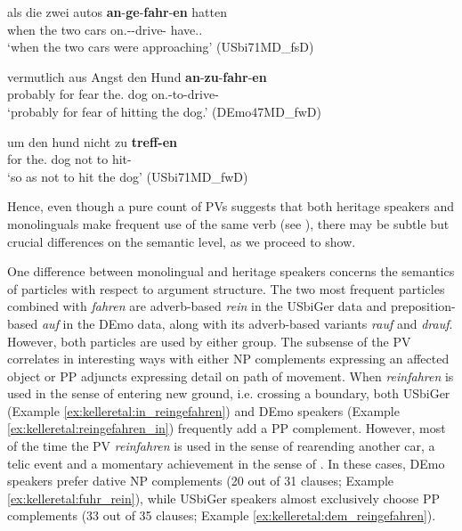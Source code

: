 \documentclass[output=paper,colorlinks,citecolor=brown]{langscibook}
\begin{document}
\ea
\label{ex:kelleretal:angefahren}
\gll als die zwei autos \textbf{an}-\textbf{ge}-\textbf{fahr}-\textbf{en} hatten\\
when the two cars on.\Vpart{}-\Ptcp{}-drive-\Ptcp{} have.\Pst.\Tpl{}\\
\glt `when the two cars were approaching' (USbi71MD\_fsD)

\ex
\label{ex:kelleretal:anzufahren}
\gll vermutlich aus Angst den Hund \textbf{an}-\textbf{zu}-\textbf{fahr}-\textbf{en}\\
probably for fear the.\Acc{} dog on.\Vpart{}-to-drive-\Inf{}\\
\glt `probably for fear of hitting the dog.' (DEmo47MD\_fwD)

\ex
\label{ex:kelleretal:treffen}
\gll um den hund nicht zu \textbf{treff-en}\\
for the.\Acc{} dog not to hit-\Inf{}\\
\glt `so as not to hit the dog' (USbi71MD\_fwD)
\z

Hence, even though a pure count of PVs suggests that both heritage speakers and monolinguals make frequent use of the same verb (see ), there may be subtle but crucial differences on the semantic level, as we proceed to show.

One difference between monolingual and heritage speakers concerns the semantics of particles with respect to argument structure. The two most frequent particles combined with \textit{fahren} are adverb-based \textit{rein} in the USbiGer data and preposition-based \textit{auf} in the DEmo data, along with its adverb-based variants \textit{rauf} and \textit{drauf}. However, both particles are used by either group. The subsense of the PV correlates in interesting ways with either NP complements expressing an affected object or PP adjuncts expressing detail on path of movement. When \textit{reinfahren} is used in the sense of entering new ground, i.e. crossing a boundary, both USbiGer (Example \ref{ex:kelleretal:in_reingefahren}) and DEmo speakers (Example \ref{ex:kelleretal:reingefahren_in}) frequently add a PP complement. However, most of the time the PV \textit{reinfahren} is used in the sense of rearending another car, a telic event and a momentary achievement in the sense of \citet{Vendler1957}. In these cases, DEmo speakers prefer dative NP complements (20 out of 31 clauses; Example \ref{ex:kelleretal:fuhr_rein}), while USbiGer speakers almost exclusively choose PP complements (33 out of 35 clauses; Example \ref{ex:kelleretal:dem_reingefahren}).
\end{document}
